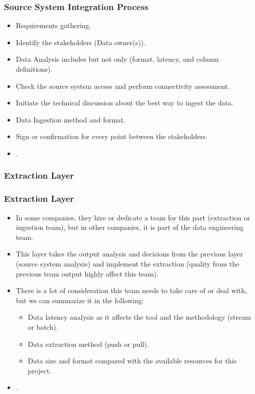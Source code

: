 \begin{frame}
    \frametitle{Source System Integration Process}
    \begin{itemize}[<+->]
        \item  Requirements gathering. %
        \item  Identify the stakeholders (Data owner(s)).
        \item  Data Analysis includes but not only (format, latency, and column definitions).
        \item  Check the source system access and perform connectivity assessment.
        \item  Initiate the technical discussion about the best way to ingest the data.
        \item  Data Ingestion method and format.
        \item  Sign or confirmation for every point between the stakeholders.
        \item  {}.
    \end{itemize}

\end{frame}


\VideoClassification[column=2, colour=blue]
\subsubsection{Extraction Layer}

\begin{frame}
    \frametitle{Extraction Layer}
    \begin{itemize}[<+->]
		\item In some companies, they hire or dedicate a team for this part (extraction or ingestion team), but in other companies, it is part of the data engineering team.
		\item This layer takes the output analysis and decisions from the previous layer (source system analysis) and implement the extraction (quality from the previous team output highly affect this team).
		\item There is a lot of consideration this team needs to take care of or deal with, but we can summarize it in the following:
		\begin{itemize}[<+->]
			\item Data latency analysis as it affects the tool and the methodology (stream or batch).
			\item Data extraction method (push or pull).
			\item Data size and format compared with the available resources for this project.
	    \end{itemize}
        \item {}.
    \end{itemize}
\end{frame}

